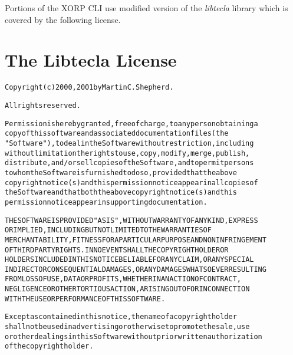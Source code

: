 Portions of the XORP CLI use modified version of the {\it libtecla}
library which is covered by the following license.

\section*{The Libtecla License}
\vspace{-0.3in}
\begin{alltt}
\small\noindent
Copyright (c) 2000, 2001 by Martin C. Shepherd.

All rights reserved.

Permission is hereby granted, free of charge, to any person obtaining a
copy of this software and associated documentation files (the
"Software"), to deal in the Software without restriction, including
without limitation the rights to use, copy, modify, merge, publish,
distribute, and/or sell copies of the Software, and to permit persons
to whom the Software is furnished to do so, provided that the above
copyright notice(s) and this permission notice appear in all copies of
the Software and that both the above copyright notice(s) and this
permission notice appear in supporting documentation.

THE SOFTWARE IS PROVIDED "AS IS", WITHOUT WARRANTY OF ANY KIND, EXPRESS
OR IMPLIED, INCLUDING BUT NOT LIMITED TO THE WARRANTIES OF
MERCHANTABILITY, FITNESS FOR A PARTICULAR PURPOSE AND NONINFRINGEMENT
OF THIRD PARTY RIGHTS. IN NO EVENT SHALL THE COPYRIGHT HOLDER OR
HOLDERS INCLUDED IN THIS NOTICE BE LIABLE FOR ANY CLAIM, OR ANY SPECIAL
INDIRECT OR CONSEQUENTIAL DAMAGES, OR ANY DAMAGES WHATSOEVER RESULTING
FROM LOSS OF USE, DATA OR PROFITS, WHETHER IN AN ACTION OF CONTRACT,
NEGLIGENCE OR OTHER TORTIOUS ACTION, ARISING OUT OF OR IN CONNECTION
WITH THE USE OR PERFORMANCE OF THIS SOFTWARE.

Except as contained in this notice, the name of a copyright holder
shall not be used in advertising or otherwise to promote the sale, use
or other dealings in this Software without prior written authorization
of the copyright holder.
\end{alltt}
